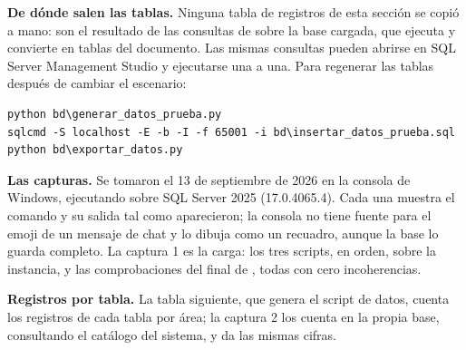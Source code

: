 \textbf{De dónde salen las tablas.} Ninguna tabla de registros de esta sección se copió a mano: son el resultado de las consultas de  sobre la base cargada, que  ejecuta y convierte en tablas del documento. Las mismas consultas pueden abrirse en SQL Server Management Studio y ejecutarse una a una. Para regenerar las tablas después de cambiar el escenario:

\begin{lstlisting}[style=sql]
python bd\generar_datos_prueba.py
sqlcmd -S localhost -E -b -I -f 65001 -i bd\insertar_datos_prueba.sql
python bd\exportar_datos.py
\end{lstlisting}

\textbf{Las capturas.} Se tomaron el 13 de septiembre de 2026 en la consola de Windows, ejecutando  sobre SQL Server 2025 (17.0.4065.4). Cada una muestra el comando y su salida tal como aparecieron; la consola no tiene fuente para el emoji de un mensaje de chat y lo dibuja como un recuadro, aunque la base lo guarda completo. La captura 1 es la carga: los tres scripts, en orden, sobre la instancia, y las \dpNumComprobaciones{} comprobaciones del final de , todas con cero incoherencias.


\textbf{Registros por tabla.} La tabla siguiente, que genera el script de datos, cuenta los registros de cada tabla por área; la captura 2 los cuenta en la propia base, consultando el catálogo del sistema, y da las mismas cifras.



